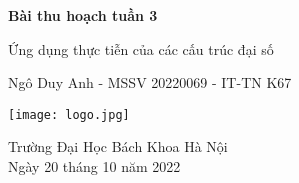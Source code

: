 \begin{titlepage}
	\begin{center}
		\vspace*{1cm}
		\huge
		\textbf{Bài thu hoạch tuần 3}
		
		\Large
		Ứng dụng thực tiễn của các cấu trúc đại số
		
		\large
		\vspace{0.5cm}
		Ngô Duy Anh - MSSV 20220069 - IT-TN K67
		
		\vfill
		
		\vspace{0.8cm}
		
		\texttt{[image: logo.jpg]}
		
		\vfill
		Trường Đại Học Bách Khoa Hà Nội\\
		Ngày 20 tháng 10 năm 2022
		
	\end{center}
\end{titlepage}